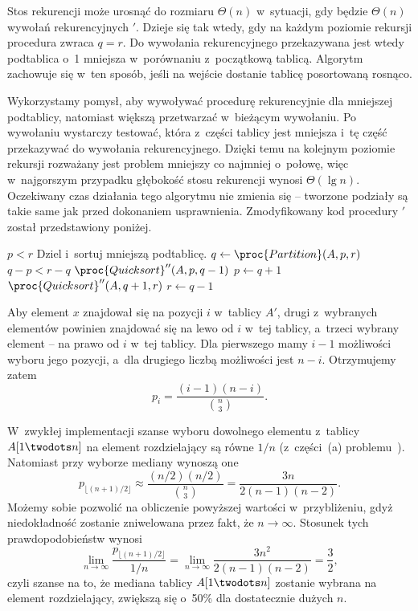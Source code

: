 \subproblem %
Stos rekurencji może urosnąć do rozmiaru $\Theta(n)$ w~sytuacji, gdy będzie $\Theta(n)$ wywołań rekurencyjnych $'$. Dzieje się tak wtedy, gdy na każdym poziomie rekursji procedura  zwraca $q=r$. Do wywołania rekurencyjnego przekazywana jest wtedy podtablica o~1 mniejsza w~porównaniu z~początkową tablicą. Algorytm zachowuje się w~ten sposób, jeśli na wejście dostanie tablicę posortowaną rosnąco.

\subproblem %
Wykorzystamy pomysł, aby wywoływać procedurę rekurencyjnie dla mniejszej podtablicy, natomiast większą przetwarzać w~bieżącym wywołaniu. Po wywołaniu  wystarczy testować, która z~części tablicy jest mniejsza i~tę część przekazywać do wywołania rekurencyjnego. Dzięki temu na kolejnym poziomie rekursji rozważany jest problem mniejszy co najmniej o~połowę, więc w~najgorszym przypadku głębokość stosu rekurencji wynosi $\Theta(\lg n)$. Oczekiwany czas działania tego algorytmu nie zmienia się -- tworzone podziały są takie same jak przed dokonaniem usprawnienia. Zmodyfikowany kod procedury $'$ został przedstawiony poniżej.
\begin{codebox}
\li	\While $p<r$
\li		\Do
			\Comment Dziel i~sortuj mniejszą podtablicę.
\li			$q\gets\proc{Partition}(A,p,r)$
\li			\If $q-p<r-q$
\li				\Then
					$\proc{Quicksort}''(A,p,q-1)$
\li					$p\gets q+1$
\li				\Else
					$\proc{Quicksort}''(A,q+1,r)$
\li					$r\gets q-1$
				\End
		\End
\end{codebox}


\subproblem %
Aby element $x$ znajdował się na pozycji $i$ w~tablicy $A'$, drugi z~wybranych elementów powinien znajdować się na lewo od $i$ w~tej tablicy, a~trzeci wybrany element -- na prawo od $i$ w~tej tablicy. Dla pierwszego mamy $i-1$ możliwości wyboru jego pozycji, a~dla drugiego liczbą możliwości jest $n-i$. Otrzymujemy zatem
\[
	p_i = \frac{(i-1)(n-i)}{\binom{n}{3}}.
\]

\subproblem %
W~zwykłej implementacji szanse wyboru dowolnego elementu z~tablicy $A[1\twodots n]$ na element rozdzielający są równe $1/n$ (z~części~(a) problemu~). Natomiast przy wyborze mediany wynoszą one
\[
	p_{\lfloor(n+1)/2\rfloor} \approx \frac{(n/2)(n/2)}{\binom{n}{3}} = \frac{3n}{2(n-1)(n-2)}.
\]
Możemy sobie pozwolić na obliczenie powyższej wartości w~przybliżeniu, gdyż niedokładność zostanie zniwelowana przez fakt, że $n\to\infty$. Stosunek tych prawdopodobieństw wynosi
\[
	\lim_{n\to\infty}\frac{p_{\lfloor(n+1)/2\rfloor}}{1/n} = \lim_{n\to\infty}\frac{3n^2}{2(n-1)(n-2)} = \frac{3}{2},
\]
czyli szanse na to, że mediana tablicy $A[1\twodots n]$ zostanie wybrana na element rozdzielający, zwiększą się o~50\% dla dostatecznie dużych $n$.

